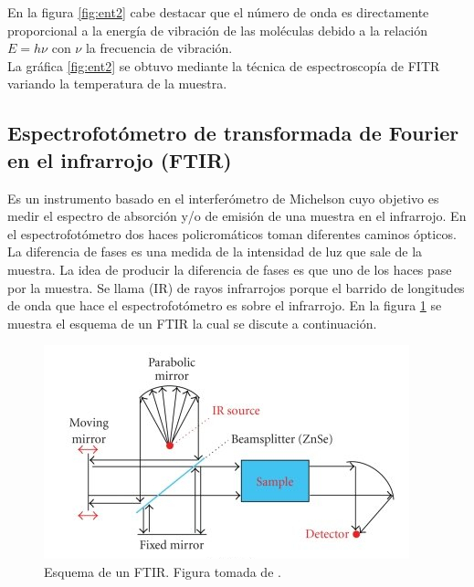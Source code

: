 \documentclass[%
 reprint,
 amsmath,amssymb,
 aps,
]{revtex4-2}
\begin{document}
En la figura \ref{fig:ent2} cabe destacar que el n\'{u}mero de onda es directamente proporcional a la energ\'{i}a de vibraci\'{o}n de las mol\'{e}culas debido a la relaci\'{o}n $E=h\nu$ con $\nu$ la frecuencia de vibraci\'{o}n.\\
La gr\'{a}fica \ref{fig:ent2} se obtuvo mediante la t\'{e}cnica de espectroscop\'{i}a de FITR variando la temperatura de la muestra.
\subsection{Espectrofot\'{o}metro de transformada de Fourier en el infrarrojo (FTIR)}
Es un instrumento basado en el interfer\'{o}metro de Michelson cuyo objetivo es medir el espectro de absorci\'{o}n y/o de emisi\'{o}n de una muestra en el infrarrojo. En el espectrofot\'{o}metro dos haces policrom\'{a}ticos  toman diferentes caminos \'{o}pticos. La diferencia de fases es una medida de la intensidad de luz que sale de la muestra. La idea de producir la diferencia de fases es que uno de los haces pase por la muestra. Se llama (IR) de rayos infrarrojos porque el barrido de longitudes de onda que hace el espectrofot\'{o}metro es sobre el infrarrojo.
En la figura \ref{fig:FTIR} se muestra el esquema de un FTIR la cual se discute a continuaci\'{o}n.
\begin{figure}[h]
  \includegraphics[width=\linewidth]{FTIR.jpg}
  \caption{Esquema de un FTIR. Figura tomada de \cite{Downes2010}.}
  \label{fig:FTIR}
\end{figure}
\end{document}

